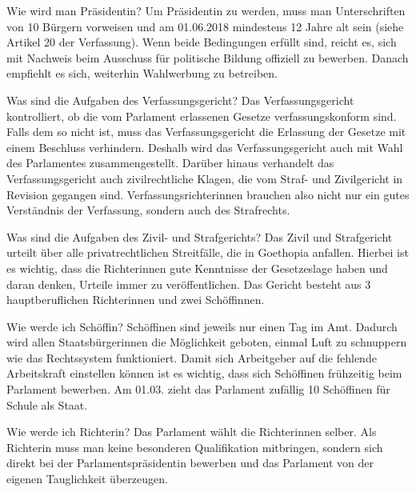 \documentclass{sasbase}
\begin{document}
\begin{question}{Wie wird man Pr\"{a}sidentin?}
	Um Pr\"{a}sidentin zu werden, muss man Unterschriften von 10 B\"{u}rgern vorweisen und am 01.06.2018 mindestens 12 Jahre alt sein (siehe Artikel 20 der Verfassung). Wenn beide Bedingungen erf\"{u}llt sind, reicht es, sich mit Nachweis beim Ausschuss f\"{u}r politische Bildung offiziell zu bewerben. Danach empfiehlt es sich, weiterhin Wahlwerbung zu betreiben.
\end{question}

\begin{question}{Was sind die Aufgaben des Verfassungsgericht?}
	Das Verfassungsgericht kontrolliert, ob die vom Parlament erlassenen Gesetze verfassungskonform sind. Falls dem so nicht ist, muss das Verfassungsgericht die Erlassung der Gesetze mit einem Beschluss verhindern. Deshalb wird das Verfassungsgericht auch mit Wahl des Parlamentes zusammengestellt. Dar\"{u}ber hinaus verhandelt das Verfassungsgericht auch zivilrechtliche Klagen, die vom Straf- und Zivilgericht in Revision gegangen sind. Verfassungsrichterinnen brauchen also nicht nur ein gutes Verst\"{a}ndnis der Verfassung, sondern auch des Strafrechts.
\end{question}

\begin{question}{Was sind die Aufgaben des Zivil- und Strafgerichts?}
	Das Zivil und Strafgericht urteilt \"{u}ber alle privatrechtlichen Streitf\"{a}lle, die in Goethopia anfallen. Hierbei ist es wichtig, dass die Richterinnen gute Kenntnisse der Gesetzeslage haben und daran denken, Urteile immer zu ver\"{o}ffentlichen. Das Gericht besteht aus 3 hauptberuflichen Richterinnen und zwei Sch\"{o}ffinnen.
\end{question}

\begin{question}{Wie werde ich Sch\"{o}ffin?}
	Sch\"{o}ffinen sind jeweils nur einen Tag im Amt. Dadurch wird allen Staatsb\"{u}rgerinnen die M\"{o}glichkeit geboten, einmal Luft zu schnuppern wie das Rechtssystem funktioniert. Damit sich Arbeitgeber auf die fehlende Arbeitskraft einstellen k\"{o}nnen ist es wichtig, dass sich Sch\"{o}ffinen fr\"{u}hzeitig beim Parlament bewerben. Am 01.03. zieht das Parlament zuf\"{a}llig 10 Sch\"{o}ffinen f\"{u}r Schule als Staat.
\end{question}

\begin{question}{Wie werde ich Richterin?}
	Das Parlament w\"{a}hlt die Richterinnen selber. Als Richterin muss man keine besonderen Qualifikation mitbringen, sondern sich direkt bei der Parlamentspr\"{a}sidentin bewerben und das Parlament von der eigenen Tauglichkeit \"{u}berzeugen.
\end{question}
\end{document}
